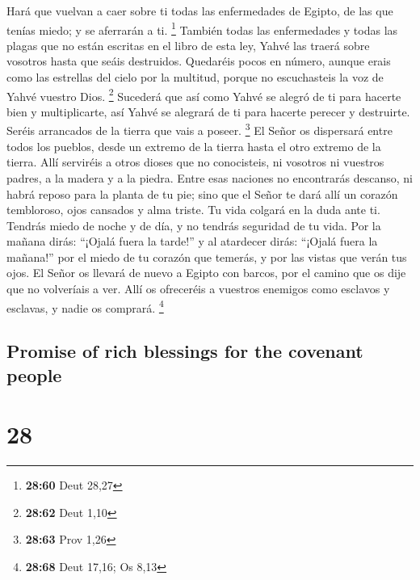 \begin{paracol}{2}
Hará que vuelvan a caer sobre ti todas las enfermedades de Egipto, de
las que tenías miedo; y se aferrarán a ti. \footnote{\textbf{28:60} Deut
  28,27}  También todas las enfermedades y todas las
plagas que no están escritas en el libro de esta ley, Yahvé las traerá
sobre vosotros hasta que seáis destruidos.  Quedaréis
pocos en número, aunque erais como las estrellas del cielo por la
multitud, porque no escuchasteis la voz de Yahvé vuestro Dios.
\footnote{\textbf{28:62} Deut 1,10}  Sucederá que así
como Yahvé se alegró de ti para hacerte bien y multiplicarte, así Yahvé
se alegrará de ti para hacerte perecer y destruirte. Seréis arrancados
de la tierra que vais a poseer. \footnote{\textbf{28:63} Prov 1,26}
 El Señor os dispersará entre todos los pueblos, desde un
extremo de la tierra hasta el otro extremo de la tierra. Allí serviréis
a otros dioses que no conocisteis, ni vosotros ni vuestros padres, a la
madera y a la piedra.  Entre esas naciones no encontrarás
descanso, ni habrá reposo para la planta de tu pie; sino que el Señor te
dará allí un corazón tembloroso, ojos cansados y alma triste.
 Tu vida colgará en la duda ante ti. Tendrás miedo de
noche y de día, y no tendrás seguridad de tu vida.  Por
la mañana dirás: ``¡Ojalá fuera la tarde!'' y al atardecer dirás:
``¡Ojalá fuera la mañana!'' por el miedo de tu corazón que temerás, y
por las vistas que verán tus ojos.  El Señor os llevará
de nuevo a Egipto con barcos, por el camino que os dije que no
volveríais a ver. Allí os ofreceréis a vuestros enemigos como esclavos y
esclavas, y nadie os comprará. \footnote{\textbf{28:68} Deut 17,16; Os
  8,13}

\switchcolumn
\begin{otherlanguage}{english}

\hypertarget{promise-of-rich-blessings-for-the-covenant-people}{%
\subsection{Promise of rich blessings for the covenant
people}\label{promise-of-rich-blessings-for-the-covenant-people}}

\hypertarget{section-55}{%
\section{28}\label{section-55}}


\end{otherlanguage}
\end{paracol}
